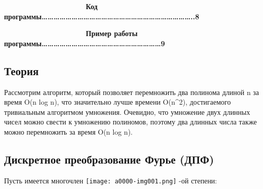 \documentclass[a4paper]{article}
\renewcommand\thepage{\arabic{page}}
\begin{document}
\bigskip

{\bfseries
\ \ \ \ \ \ \ \ \ \ \ \ \ \ \ \ \ \ \ \ Код программы…………………………………………………………………..8}


\bigskip

{\bfseries
\ \ \ \ \ \ \ \ \ \ \ \ \ \ \ \ \ \ \ \ Пример работы программы……………………………………………………9}


\bigskip


\bigskip


\bigskip


\bigskip


\bigskip


\bigskip


\bigskip


\bigskip


\bigskip


\bigskip


\bigskip


\bigskip


\bigskip


\bigskip


\bigskip


\bigskip


\bigskip


\bigskip


\bigskip


\bigskip


\bigskip


\bigskip


\bigskip


\bigskip


\bigskip


\bigskip

{\centering{}\bfseries
\thepage{}
\par}

\subsection[Теория]{ Теория}
{
Рассмотрим алгоритм, который позволяет перемножить два полинома длиной n за время O(n log n), что значительно лучше
времени O(n\^{}2), достигаемого тривиальным алгоритмом умножения. Очевидно, что умножение двух длинных чисел можно
свести к умножению полиномов, поэтому два длинных числа также можно перемножить за время O(n log n).}

\subsection[Дискретное преобразование Фурье (ДПФ) ]{ Дискретное преобразование Фурье (ДПФ) }
\foreignlanguage{russian}{Пусть имеется многочлен } \texttt{[image: a0000-img001.png]}
\foreignlanguage{russian}{{}-ой степени:}
\end{document}
